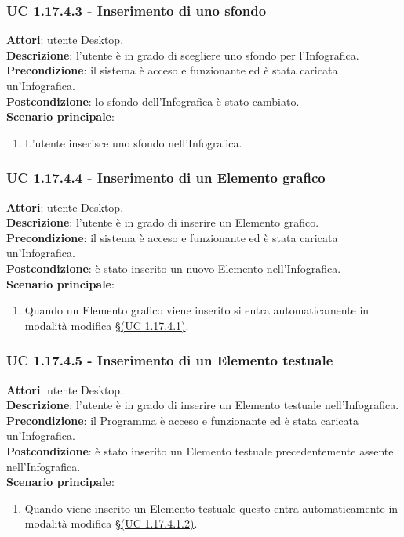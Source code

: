 \subsubsection{UC 1.17.4.3 - Inserimento di uno sfondo}{
	\label{uc1.17.4.3}
	\textbf{Attori}: utente Desktop. \\
	\textbf{Descrizione}: l'utente è in grado di scegliere uno sfondo per l'Infografica. \\
	\textbf{Precondizione}: il sistema è acceso e funzionante ed è stata caricata un'Infografica.	\\
	\textbf{Postcondizione}: lo sfondo dell'Infografica è stato cambiato.\\
	\textbf{Scenario principale}:
	\begin{enumerate}
		\item L'utente inserisce uno sfondo nell'Infografica.
	\end{enumerate}			
	}
\subsubsection{UC 1.17.4.4 - Inserimento di un Elemento grafico}{
	\label{uc1.17.4.4}
	\textbf{Attori}: utente Desktop. \\
	\textbf{Descrizione}: l'utente è in grado di inserire un Elemento grafico. \\
	\textbf{Precondizione}: il sistema è acceso e funzionante ed è stata caricata un'Infografica.	\\
	\textbf{Postcondizione}: è stato inserito un nuovo Elemento nell'Infografica.\\
	\textbf{Scenario principale}:
	\begin{enumerate}
		\item Quando un Elemento grafico viene inserito si entra automaticamente in modalità modifica \S\hyperref[uc1.17.4.1]{(UC 1.17.4.1)}.
	\end{enumerate}
	}
\subsubsection{UC 1.17.4.5 - Inserimento di un Elemento testuale}{
	\label{uc1.17.4.5}
	\textbf{Attori}: utente Desktop. \\
	\textbf{Descrizione}: l'utente è in grado di inserire un Elemento testuale nell'Infografica. \\
	\textbf{Precondizione}: il Programma è acceso e funzionante ed è stata caricata un'Infografica.	\\
	\textbf{Postcondizione}: è stato inserito un Elemento testuale precedentemente assente nell'Infografica.	\\
	\textbf{Scenario principale}:
	\begin{enumerate}
		\item Quando viene inserito un Elemento testuale questo entra automaticamente in modalità modifica \S\hyperref[uc1.17.4.1.2]{(UC 1.17.4.1.2)}.
	\end{enumerate}
	}
